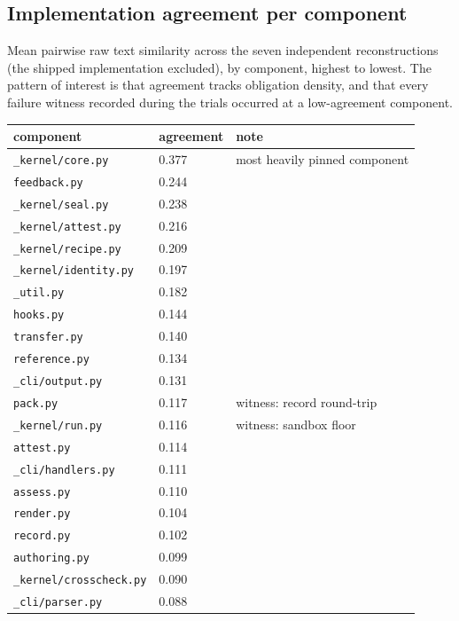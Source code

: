 \subsection{Implementation agreement per component}

Mean pairwise raw text similarity across the seven independent
reconstructions (the shipped implementation excluded), by component,
highest to lowest. The pattern of interest is that
agreement tracks obligation density, and that every failure witness
recorded during the trials occurred at a low-agreement component.

\begin{center}\small
\begin{tabular}{@{}lll@{}}
\toprule
component & agreement & note \\
\midrule
\texttt{\_kernel/core.py}      & 0.377 & most heavily pinned component \\
\texttt{feedback.py}           & 0.244 & \\
\texttt{\_kernel/seal.py}      & 0.238 & \\
\texttt{\_kernel/attest.py}    & 0.216 & \\
\texttt{\_kernel/recipe.py}    & 0.209 & \\
\texttt{\_kernel/identity.py}  & 0.197 & \\
\texttt{\_util.py}             & 0.182 & \\
\texttt{hooks.py}              & 0.144 & \\
\texttt{transfer.py}           & 0.140 & \\
\texttt{reference.py}          & 0.134 & \\
\texttt{\_cli/output.py}       & 0.131 & \\
\texttt{pack.py}               & 0.117 & witness: record round-trip \\
\texttt{\_kernel/run.py}       & 0.116 & witness: sandbox floor \\
\texttt{attest.py}             & 0.114 & \\
\texttt{\_cli/handlers.py}     & 0.111 & \\
\texttt{assess.py}             & 0.110 & \\
\texttt{render.py}             & 0.104 & \\
\texttt{record.py}             & 0.102 & \\
\texttt{authoring.py}          & 0.099 & \\
\texttt{\_kernel/crosscheck.py}& 0.090 & \\
\texttt{\_cli/parser.py}       & 0.088 & \\

\end{tabular}
\end{center}
